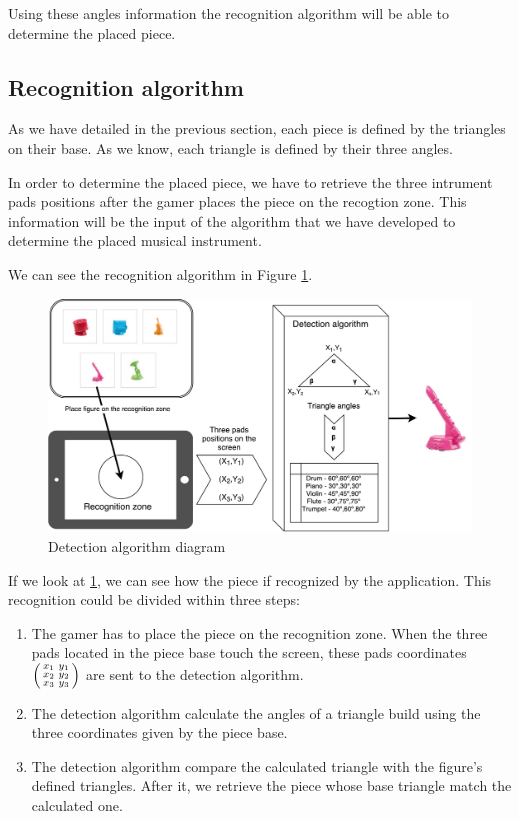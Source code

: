 Using these angles information the recognition algorithm will be able to determine the placed piece.

\newpage
\subsection{Recognition algorithm}
\label{sec:recognitionalgorithm}
As we have detailed in the previous section, each piece is defined by the triangles on their base. As we know, each triangle is defined by their three angles.

In order to determine the placed piece, we have to retrieve the three intrument pads positions after the gamer places the piece on the recogtion zone. This information will be the input of the algorithm that we have developed to determine the placed musical instrument.

We can see the recognition algorithm in Figure \ref{fig:detectionalgorithm}.

\begin{figure}[ht!]
	\centering
	\includegraphics[width=400pt]{graphics/architecture/DetectionAlgorithm.pdf}
	\caption{Detection algorithm diagram}
	\label{fig:detectionalgorithm}
\end{figure}

If we look at \ref{fig:detectionalgorithm}, we can see how the piece if recognized by the application. This recognition could be divided within three steps:

\begin{enumerate}
	\item The gamer has to place the piece on the recognition zone. When the three pads located in the piece base touch the screen, these pads coordinates $\Bigl(\begin{smallmatrix} x_1&y_1 \\ x_2&y_2 \\ x_3&y_3 \end{smallmatrix} \Bigr)$ are sent to the detection algorithm.
	\item The detection algorithm calculate the angles of a triangle build using the three coordinates given by the piece base.
	\item The detection algorithm compare the calculated triangle with the figure's defined triangles. After it, we retrieve the piece whose base triangle match the calculated one.
\end{enumerate}

